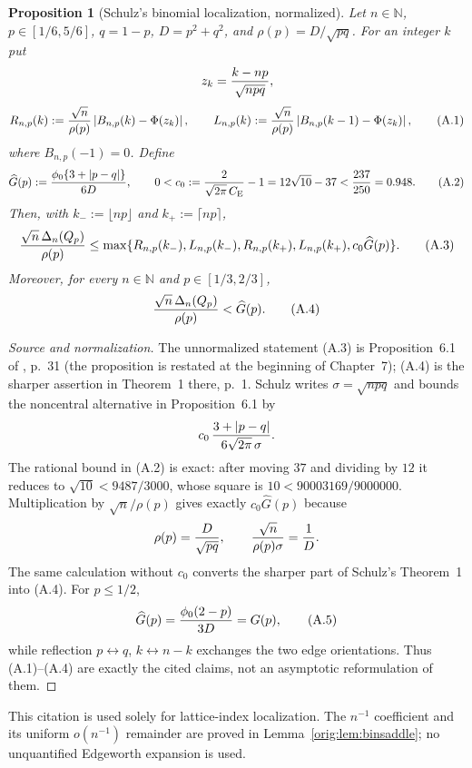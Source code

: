 \documentclass[11pt,a4paper]{article}
\numberwithin{equation}{section}
\newtheorem{proposition}[theorem]{Proposition}
\theoremstyle{definition}
\theoremstyle{remark}
\newcommand{\CE}{C_{\mathrm E}}
\begin{document}
\begin{proposition}[Schulz's binomial localization, normalized]\label{orig:prop:schulzlocal}
Let $n\in\mathbb N$, $p\in[1/6,5/6]$, $q=1-p$,
$D=p^2+q^2$, and $\rho(p)=D/\sqrt{pq}$.  For an integer $k$ put
\[
 z_k={k-np\over\sqrt{npq}},
\]
\[
 R_{n,p}(k):={\sqrt n\over\rho(p)}
       \left|B_{n,p}(k)-\Phi(z_k)\right|,\qquad
 L_{n,p}(k):={\sqrt n\over\rho(p)}
       \left|B_{n,p}(k-1)-\Phi(z_k)\right|,              \tag{A.1}
\]
where $B_{n,p}(-1)=0$.  Define
\[
 \widehat G(p):={\phi_0\{3+|p-q|\}\over6D},\qquad
 0<c_0:={2\over\sqrt{2\pi}\,\CE}-1
      =12\sqrt {10}-37<{237\over250}=0.948.             \tag{A.2}
\]
Then, with $k_-:=\lfloor np\rfloor$ and $k_+:=\lceil np\rceil$,
\[
 {\sqrt n\,\Delta_n(Q_p)\over\rho(p)}
 \le\max\{R_{n,p}(k_-),L_{n,p}(k_-),
            R_{n,p}(k_+),L_{n,p}(k_+),c_0\widehat G(p)\}. \tag{A.3}
\]
Moreover, for every $n\in\mathbb N$ and $p\in[1/3,2/3]$,
\[
             {\sqrt n\,\Delta_n(Q_p)\over\rho(p)}
             <\widehat G(p).                              \tag{A.4}
\]
\end{proposition}

\begin{proof}[Source and normalization]
The unnormalized statement (A.3) is Proposition~6.1 of \cite{Schulz2016},
p.~31 (the proposition is restated at the beginning of Chapter~7); (A.4)
is the sharper assertion in Theorem~1 there, p.~1.  Schulz writes
$\sigma=\sqrt{npq}$ and bounds the noncentral alternative in Proposition~6.1
by
\[
 c_0\,{3+|p-q|\over6\sqrt{2\pi}\,\sigma}.
\]
The rational bound in (A.2) is exact: after moving $37$ and dividing by
$12$ it reduces to $\sqrt {10}<9487/3000$, whose square is
$10<90003169/9000000$.
Multiplication by $\sqrt n/\rho(p)$ gives exactly
$c_0\widehat G(p)$ because
\[
 \rho(p)={D\over\sqrt{pq}},\qquad
 {\sqrt n\over\rho(p)\sigma}={1\over D}.
\]
The same calculation without $c_0$ converts the sharper part of
Schulz's Theorem~1 into (A.4).  For $p\le1/2$,
\[
 \widehat G(p)={\phi_0(2-p)\over3D}=G(p),                \tag{A.5}
\]
while reflection $p\leftrightarrow q$, $k\leftrightarrow n-k$ exchanges
the two edge orientations.  Thus (A.1)--(A.4) are exactly the cited
claims, not an asymptotic reformulation of them.
\end{proof}

This citation is used solely for lattice-index localization.  The
$n^{-1}$ coefficient and its uniform $o(n^{-1})$ remainder are proved in
Lemma~\ref{orig:lem:binsaddle}; no unquantified Edgeworth expansion is used.
\end{document}
